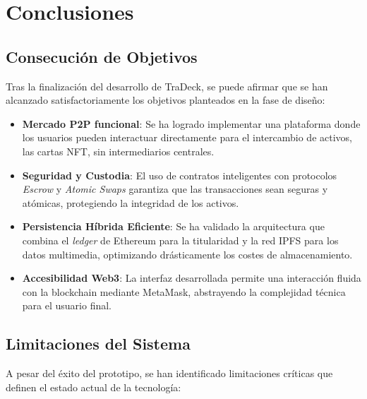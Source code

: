 \chapter{Conclusiones}\label{cap:conclusiones}

\section{Consecución de Objetivos}
Tras la finalización del desarrollo de TraDeck, se puede afirmar que se han alcanzado satisfactoriamente los objetivos planteados en la fase de diseño:

\begin{itemize}
	\item \textbf{Mercado P2P funcional}: Se ha logrado implementar una plataforma donde los usuarios pueden interactuar directamente para el intercambio de activos, las cartas NFT, sin intermediarios centrales.
	\item \textbf{Seguridad y Custodia}: El uso de contratos inteligentes con protocolos \textit{Escrow} y \textit{Atomic Swaps} garantiza que las transacciones sean seguras y atómicas, protegiendo la integridad de los activos.
	\item \textbf{Persistencia Híbrida Eficiente}: Se ha validado la arquitectura que combina el \textit{ledger} de Ethereum para la titularidad y la red IPFS para los datos multimedia, optimizando drásticamente los costes de almacenamiento.
	\item \textbf{Accesibilidad Web3}: La interfaz desarrollada permite una interacción fluida con la blockchain mediante MetaMask, abstrayendo la complejidad técnica para el usuario final.
\end{itemize}

\section{Limitaciones del Sistema}
A pesar del éxito del prototipo, se han identificado limitaciones críticas que definen el estado actual de la tecnología:


